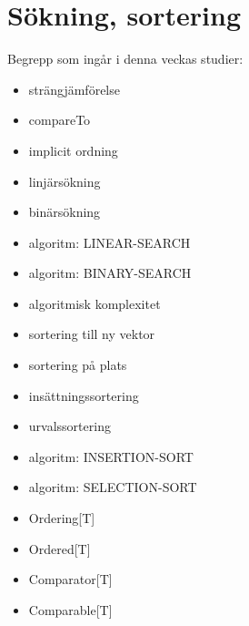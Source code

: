 \chapter{Sökning, sortering}\label{chapter:W12}
Begrepp som ingår i denna veckas studier:
\begin{itemize}[noitemsep,label={$\square$},leftmargin=*]
\item strängjämförelse
\item compareTo
\item implicit ordning
\item linjärsökning
\item binärsökning
\item algoritm: LINEAR-SEARCH
\item algoritm: BINARY-SEARCH
\item algoritmisk komplexitet
\item sortering till ny vektor
\item sortering på plats
\item insättningssortering
\item urvalssortering
\item algoritm: INSERTION-SORT
\item algoritm: SELECTION-SORT
\item Ordering[T]
\item Ordered[T]
\item Comparator[T]
\item Comparable[T]\end{itemize}
